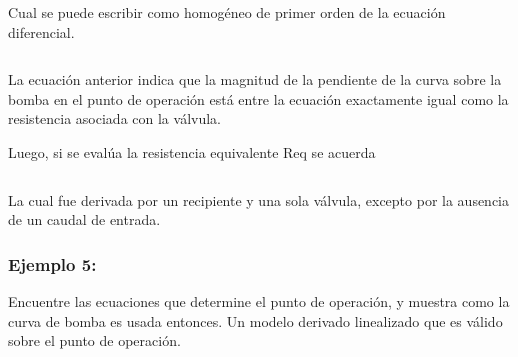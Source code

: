 \documentclass[a4paper,12pt,twoside]{proyectotanquesecci}
\begin{document}

\begin{equation}
\end{equation}


\begin{equation}
\end{equation}


\begin{equation}
\end{equation}


\begin{equation}
\end{equation}

Cual se puede escribir como homogéneo de primer orden de la ecuación diferencial.

\begin{equation}
\end{equation}

La ecuación anterior indica que la magnitud de la pendiente de la curva sobre la bomba en el punto de operación  está entre la ecuación exactamente igual como la resistencia asociada con la válvula. 

Luego, si se evalúa la resistencia equivalente Req se acuerda

\begin{equation}
\end{equation}

La cual fue derivada por un recipiente y una sola válvula, excepto por la ausencia de un caudal de entrada.

\subsubsection{Ejemplo 5:}

Encuentre las ecuaciones que determine el punto de operación, y muestra como la curva de bomba es usada entonces. Un modelo derivado linealizado que es válido sobre el punto de operación. \\
\end{document}
